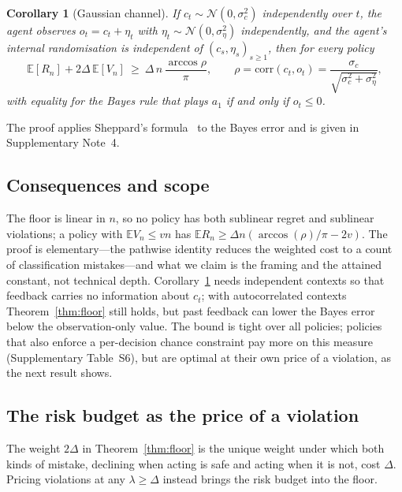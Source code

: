 \documentclass[10pt,a4paper]{article}
\newtheorem{corollary}{Corollary}
\begin{document}
\begin{corollary}[Gaussian channel]\label{cor:gauss}
If $c_t\sim\mathcal N(0,\sigma_c^2)$ independently over $t$, the agent observes $o_t=c_t+\eta_t$ with
$\eta_t\sim\mathcal N(0,\sigma_\eta^2)$ independently, and the agent's internal randomisation is
independent of $(c_s,\eta_s)_{s\ge1}$, then for every policy
\begin{equation}
\mathbb E[R_n]+2\Delta\,\mathbb E[V_n]\ \ge\ \Delta\,n\,\frac{\arccos\rho}{\pi},\qquad
\rho=\mathrm{corr}(c_t,o_t)=\frac{\sigma_c}{\sqrt{\sigma_c^2+\sigma_\eta^2}},
\label{eq:gauss}
\end{equation}
with equality for the Bayes rule that plays $a_1$ if and only if $o_t\le0$.
\end{corollary}
\noindent The proof applies Sheppard's formula~\cite{sheppard1899} to the Bayes error and is given in Supplementary Note~4.



\subsection*{Consequences and scope}
The floor is linear in $n$, so no policy has both sublinear regret and sublinear violations; a policy
with $\mathbb E V_n\le vn$ has $\mathbb E R_n\ge\Delta n(\arccos(\rho)/\pi-2v)$.  The proof is elementary---the pathwise identity reduces the weighted cost to a count of classification mistakes---and what we claim is the framing and the attained constant, not technical depth.  Corollary~\ref{cor:gauss} needs independent
contexts so that feedback carries no information about $c_t$; with autocorrelated contexts
Theorem~\ref{thm:floor} still holds, but past feedback can lower the Bayes error below the
observation-only value. The bound is tight over all policies; policies that also enforce a
per-decision chance constraint pay more on this measure (Supplementary Table~S6), but are optimal at their own price of a violation, as the next result shows.

\subsection*{The risk budget as the price of a violation}
The weight $2\Delta$ in Theorem~\ref{thm:floor} is the unique weight under which both kinds of mistake, declining when acting is safe and acting when it is not, cost $\Delta$. Pricing violations at any $\lambda\ge\Delta$ instead brings the risk budget into the floor.
\end{document}
